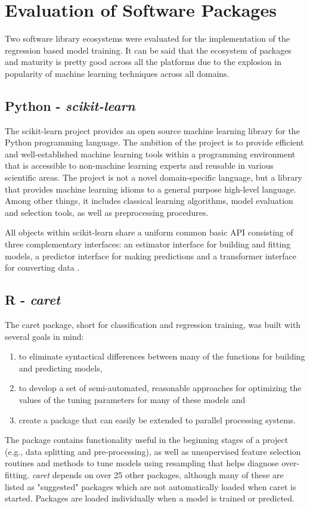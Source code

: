 \documentclass[letterpaper,12pt,titlepage,oneside,final]{report}
\begin{document}
    \section {Evaluation of Software Packages}
        Two software library ecosystems were evaluated for the implementation of the regression based model training. It can be said that the ecosystem of packages and maturity is pretty good across all the platforms due to the explosion in popularity of machine learning techniques across all domains.
        \subsection {Python - \textit{scikit-learn}}
            The scikit-learn project provides an open source machine learning library for the Python programming language. The ambition of the project is to provide efficient and well-established machine learning tools within a programming environment that is accessible to non-machine learning experts and reusable in various scientific areas. The project is not a novel domain-specific language, but a library that provides machine learning idioms to a general purpose high-level language. Among other things, it includes classical learning algorithms, model evaluation and selection tools, as well as preprocessing procedures.

            All objects within scikit-learn share a uniform common basic API consisting of three complementary interfaces: an estimator interface for building and fitting models, a predictor interface for making predictions and a transformer interface for converting data \cite{scikit-learn}.

        \subsection {R - \textit{caret}}
            The caret package, short for classification and regression training, was built with several goals in mind:
            \begin{enumerate}
                \item{to eliminate syntactical differences between many of the functions for building and predicting models,}
                \item{to develop a set of semi-automated, reasonable approaches for optimizing the values of the tuning parameters for many of these models and}
                \item{create a package that can easily be extended to parallel processing systems.}
            \end{enumerate}
            The package contains functionality useful in the beginning stages of a project (e.g., data splitting and pre-processing), as well as unsupervised feature selection routines and methods to tune models using resampling that helps diagnose over-fitting. \textit{caret} depends on over 25 other packages, although many of these are listed as "suggested" packages which are not automatically loaded when caret is started. Packages are loaded individually when a model is trained or predicted.
\end{document}
